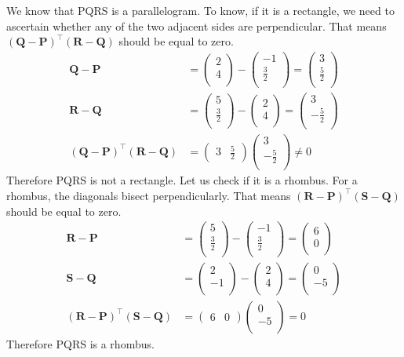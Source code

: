 \documentclass[12pt]{article}
\providecommand{\brak}[1]{\ensuremath{\left(#1\right)}}
\newcommand{\myvec}[1]{\ensuremath{\begin{pmatrix}#1\end{pmatrix}}}
\let\vec\mathbf
\begin{document}
\begin{enumerate}
\begin{figure}[!h]
	\begin{center}
	\end{center}
\caption{}
\label{fig:Fig3}
\end{figure}
We know that PQRS is a parallelogram. To know, if it is a rectangle, we need to ascertain whether any of the two adjacent sides are perpendicular. 
That means $\brak{\vec{Q}-\vec{P}}^\top\brak{\vec{R}-\vec{Q}}$ should be equal to zero. \\
\begin{align}
\vec{Q}-\vec{P} &=  \myvec{
 2 \\
 4 \\
 } - \myvec{
 -1 \\
 \frac{3}{2} \\
 } = \myvec{
 3 \\
 \frac{5}{2} \\ 
 } \\
 \vec{R}-\vec{Q} &=  \myvec{
 5 \\
 \frac{3}{2}\\
 } - \myvec{
 2 \\
 4 \\
 } = \myvec{
 3 \\
 -\frac{5}{2} \\ 
 } \\ 
 \brak{\vec{Q}-\vec{P}}^\top\brak{\vec{R}-\vec{Q}} &= \myvec{
 3 & \frac{5}{2}} \myvec{
 3 \\
 -\frac{5}{2} \\
 } \neq 0
\end{align}
Therefore PQRS is not a rectangle. Let us check if it is a rhombus. For a rhombus, the diagonals bisect perpendicularly. That means $\brak{\vec{R}-\vec{P}}^\top\brak{\vec{S}-\vec{Q}}$ should be equal to zero. \\


\begin{align}
\vec{R}-\vec{P} &=  \myvec{
 5 \\
 \frac{3}{2} \\
 } - \myvec{
 -1 \\
 \frac{3}{2} \\
 } = \myvec{
 6 \\
 0 \\ 
 } \\
 \vec{S}-\vec{Q} &=  \myvec{
 2 \\
 -1 \\
 } - \myvec{
 2 \\
 4 \\
 } = \myvec{
 0 \\
 -5 \\ 
 } \\ 
 \brak{\vec{R}-\vec{P}}^\top\brak{\vec{S}-\vec{Q}} &= \myvec{
 6 & 0} \myvec{
 0 \\
 -5 \\
 } = 0
\end{align}
Therefore PQRS is a rhombus.

\end{enumerate}
\end{document}
